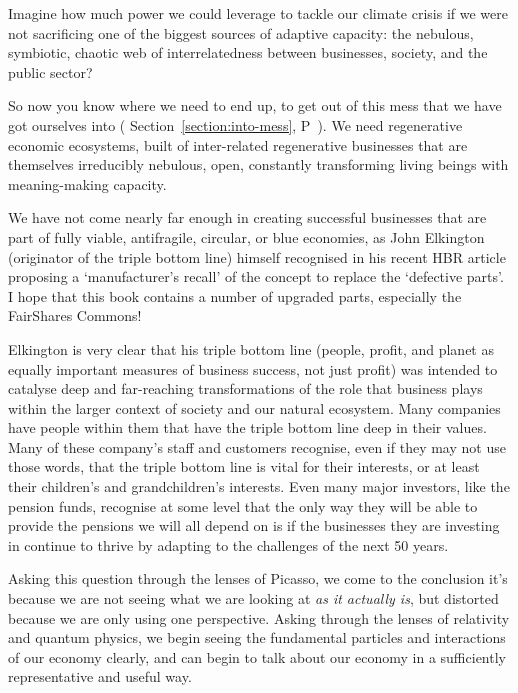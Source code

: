 Imagine how much power we could leverage to tackle our climate crisis if we were not sacrificing one of the biggest sources of adaptive capacity: the nebulous, symbiotic, chaotic web of interrelatedness between businesses, society, and the public sector?


So now you know where we need to end up, to get out of this mess that we have got ourselves into ( Section~\ref{section:into-mess}, P~\pageref{section:into-mess}). We need regenerative economic ecosystems, built of inter-related regenerative businesses that are themselves irreducibly nebulous, open, constantly transforming living beings with meaning\hyp{}making capacity.


We have not come nearly far enough in creating successful businesses that are part of fully viable, antifragile, circular, or blue economies, as John Elkington (originator of the triple bottom line) himself recognised in his recent HBR article\cite{elkington-triple} proposing a ‘manufacturer's recall’ of the concept to replace the ‘defective parts’. I hope that this book contains a number of upgraded parts, especially the FairShares Commons!


Elkington is very clear that his triple bottom line (people, profit, and planet as equally important measures of business success, not just profit) was intended to catalyse deep and far-reaching transformations of the role that business plays within the larger context of society and our natural ecosystem. Many companies have people within them that have the triple bottom line deep in their values. Many of these company's staff and customers recognise, even if they may not use those words, that the triple bottom line is vital for their interests, or at least their children’s and grandchildren’s interests. Even many major investors, like the pension funds, recognise at some level that the only way they will be able to provide the pensions we will all depend on is if the businesses they are investing in continue to thrive by adapting to the challenges of the next 50 years.


Asking this question through the lenses of Picasso, we come to the conclusion it's because we are not seeing what we are looking at \emph{as it actually is}, but distorted because we are only using one perspective. Asking through the lenses of relativity and quantum physics, we begin seeing the fundamental particles and interactions of our economy clearly, and can begin to talk about our economy in a sufficiently representative and useful way.


